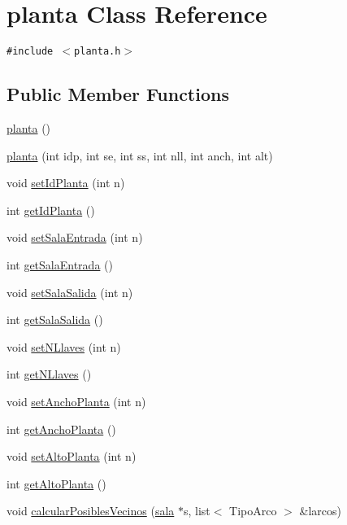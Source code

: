\hypertarget{classplanta}{
\section{planta Class Reference}
\label{classplanta}
}
{\tt \#include $<$planta.h$>$}

\subsection*{Public Member Functions}
\begin{CompactItemize}
\item 
\hyperlink{classplanta_4c93b85a355bf29b1613cc22f0ed0f46}{planta} ()
\item 
\hyperlink{classplanta_e6a56480cf07955e354043f1221177fe}{planta} (int idp, int se, int ss, int nll, int anch, int alt)
\item 
void \hyperlink{classplanta_cd23abae2d6e377abe25d48d850f7319}{setIdPlanta} (int n)
\item 
int \hyperlink{classplanta_6e9b552f6542f68eca605ed69a283980}{getIdPlanta} ()
\item 
void \hyperlink{classplanta_b322da5e5360a302601c15c98748213c}{setSalaEntrada} (int n)
\item 
int \hyperlink{classplanta_9ea0125af87508895b27bc0c2235e42a}{getSalaEntrada} ()
\item 
void \hyperlink{classplanta_3a3256c74ea714e55de672068d05ec4d}{setSalaSalida} (int n)
\item 
int \hyperlink{classplanta_dbb3b23569c310dcd01163e09674009c}{getSalaSalida} ()
\item 
void \hyperlink{classplanta_4b11a7bc1bd000f01a7af5da1df7a285}{setNLlaves} (int n)
\item 
int \hyperlink{classplanta_5087143df250ee8686a3c5387961f01e}{getNLlaves} ()
\item 
void \hyperlink{classplanta_aa7dd29c052394b78b67d7be90bbb3c3}{setAnchoPlanta} (int n)
\item 
int \hyperlink{classplanta_ef93598d5bca7e2235035a07147f4bbe}{getAnchoPlanta} ()
\item 
void \hyperlink{classplanta_935647ba7aa07152ac9a4a5bf0ec92fd}{setAltoPlanta} (int n)
\item 
int \hyperlink{classplanta_3d9fad702134aa5718b9d00ae11d7646}{getAltoPlanta} ()
\item 
void \hyperlink{classplanta_dd824feb63f74fa79c07b35292b6164d}{calcularPosiblesVecinos} (\hyperlink{classsala}{sala} $\ast$s, list$<$ TipoArco $>$ \&larcos)

\end{CompactItemize}
